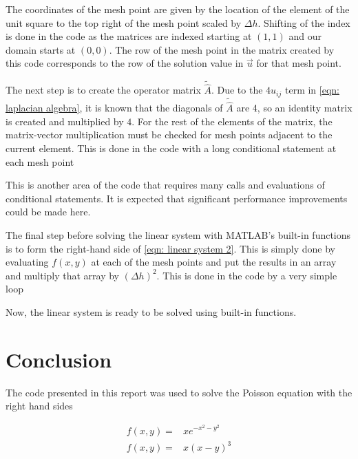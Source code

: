 \documentclass[10pt,a4paper]{article}
\begin{document}
The coordinates of the mesh point are given by the location of the element of the unit square to the top right of the mesh point scaled by $\Delta h$. Shifting of the index is done in the code as the matrices are indexed starting at $(1,1)$ and our domain starts at $(0,0)$. The row of the mesh point in the matrix created by this code corresponds to the row of the solution value in $\vec{u}$ for that mesh point.

The next step is to create the operator matrix $\tilde{\hat{A}}$. Due to the $4u_{ij}$ term in \cref{eqn: laplacian algebra}, it is known that the diagonals of $\tilde{\hat{A}}$ are 4, so an identity matrix is created and multiplied by $4$. For the rest of the elements of the matrix, the matrix-vector multiplication must be checked for mesh points adjacent to the current element. This is done in the code with a long conditional statement at each mesh point

\pagebreak


This is another area of the code that requires many calls and evaluations of conditional statements. It is expected that significant performance improvements could be made here.

The final step before solving the linear system with MATLAB's built-in functions is to form the right-hand side of \cref{eqn: linear system 2}. This is simply done by evaluating $f(x,y)$ at each of the mesh points and put the results in an array and multiply that array by $\left( \Delta h \right)^2$. This is done in the code by a very simple loop



Now, the linear system is ready to be solved using built-in functions.

\section*{Conclusion}

The code presented in this report was used to solve the Poisson equation with the right hand sides

\begin{subequations}
\begin{align}
f(x, y) =& x e^{-x^2 - y^2} \label{eqn: gaussian}\\
f(x, y) =& x \left( x - y \right)^3 \label{eqn: cubic}
\end{align}
\end{subequations}
\end{document}

